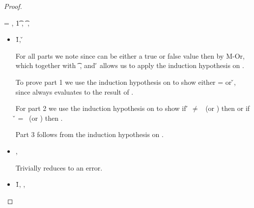 \begin{lemma}
\begin{proof}
\begin{case}[T-Local]
\end{case}

\begin{case}[T-Do]
\e{} = { {}},
  \judgement {\propenv{}} 
             { {\t1}} 
             { {}} 
             {},
           { {\t{}}} 
           {\filterset {\thenprop {\prop{}}} {\elseprop {\prop{}}}} 
           {\object{}},

\begin{itemize}
  \item[] \begin{subcase}[B-Do]
  \opsem {\openv{}} {} {\v{1}},
  \opsem {\openv{}} {} {\v{}}

For all parts we note 
    since {} can be either a true or false value
    then
    {}
    by M-Or,
    which together with 
           { {\t{}}} 
           {\filterset {\thenprop {\prop{}}} {\elseprop {\prop{}}}} 
           {\object{}},
    and
  \opsem {\openv{}} {} {\v{}}
    allows us to apply the induction hypothesis on .

To prove part 1 we use the induction hypothesis on 
to show either \object{} = \emptyobject{} 
or \inopenv {\openv{}} {\object{}} {\v{}}, since \e{} always
evaluates to the result of .

For part 2 we use the induction hypothesis on 
to show if \v{} $\not=$ \false\ (or \nil) then
        {\satisfies{\openv{}}{\thenprop{\prop{}}}}
        or
  if \v{} = \false\ (or \nil) then
        {\satisfies{\openv{}}{\elseprop{\prop{}}}}.

Part 3 follows from the induction hypothesis on .
    \end{subcase}
  \item[]

\begin{subcase}[BE-Do1]
  \opsem {\openv{}} {} {},
  \opsem {\openv{}} {\e{}} {\errorval{\v{}}}

        Trivially reduces to an error.
\end{subcase}
  \item[]
\begin{subcase}[BE-Do2]
  \opsem {\openv{}} {} {\v{1}},
  \opsem {\openv{}} {} {\errorvalv{}},
  \opsem {\openv{}} {\e{}} {\errorvalv{}}


\end{subcase}
\end{itemize}
\end{case}
\end{proof}
\end{lemma}
